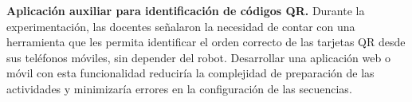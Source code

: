 \documentclass{prgrado}
\begin{document}
\textbf{Aplicación auxiliar para identificación de códigos QR.} Durante la experimentación, las docentes señalaron la necesidad de contar con una herramienta que les permita identificar el orden correcto de las tarjetas QR desde sus teléfonos móviles, sin depender del robot. Desarrollar una aplicación web o móvil con esta funcionalidad reduciría la complejidad de preparación de las actividades y minimizaría errores en la configuración de las secuencias.




{ %

\backmatter %


\newpage



} %


\end{document}
